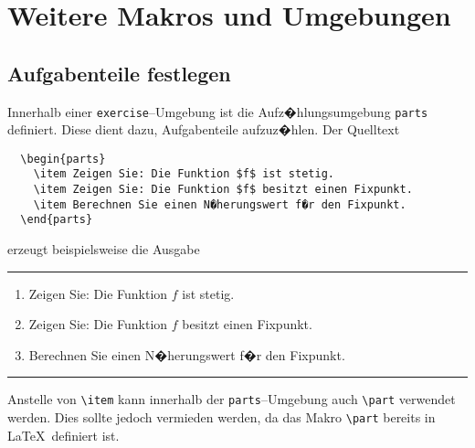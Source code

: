 \section{Weitere Makros und Umgebungen}

\subsection{Aufgabenteile festlegen}
Innerhalb einer \verb|exercise|--Umgebung ist die Aufz�hlungsumgebung \verb|parts| definiert. Diese dient dazu, Aufgabenteile aufzuz�hlen. Der Quelltext 
\begin{verbatim}
  \begin{parts}
    \item Zeigen Sie: Die Funktion $f$ ist stetig.
    \item Zeigen Sie: Die Funktion $f$ besitzt einen Fixpunkt.
    \item Berechnen Sie einen N�herungswert f�r den Fixpunkt.
  \end{parts}
\end{verbatim}
erzeugt beispielsweise die Ausgabe
\vspace*{2em}
\hrule
\begin{enumerate}
\renewcommand{\labelenumi}{(\alph{enumi})}
    \item Zeigen Sie: Die Funktion $f$ ist stetig.
    \item Zeigen Sie: Die Funktion $f$ besitzt einen Fixpunkt.
    \item Berechnen Sie einen N�herungswert f�r den Fixpunkt.
\end{enumerate}
\hrule
\vspace*{2em}

\noindent
Anstelle von \verb|\item| kann innerhalb der \verb|parts|--Umgebung auch \verb|\part| verwendet werden. Dies sollte jedoch vermieden werden, da das Makro \verb|\part| bereits in \LaTeX\ definiert ist.




